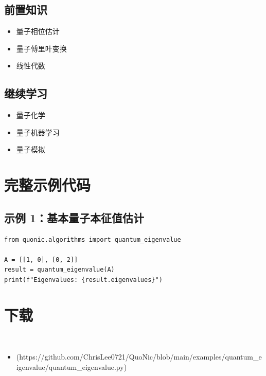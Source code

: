 \documentclass[12pt,a4paper]{article}
\begin{document}
\subsection{前置知识}
\begin{itemize}
  \item 量子相位估计
  \item 量子傅里叶变换
  \item 线性代数
\end{itemize}

\subsection{继续学习}
\begin{itemize}
  \item 量子化学
  \item 量子机器学习
  \item 量子模拟
\end{itemize}

\section{完整示例代码}

\subsection{示例 1：基本量子本征值估计}

\begin{lstlisting}[style=python]
from quonic.algorithms import quantum_eigenvalue

A = [[1, 0], [0, 2]]
result = quantum_eigenvalue(A)
print(f"Eigenvalues: {result.eigenvalues}")
\end{lstlisting}


\section{下载}

\begin{itemize}
  \item [quantum_eigenvalue.py](https://github.com/ChrisLee0721/QuoNic/blob/main/examples/quantum_eigenvalue/quantum_eigenvalue.py)
\end{itemize}
\end{document}
